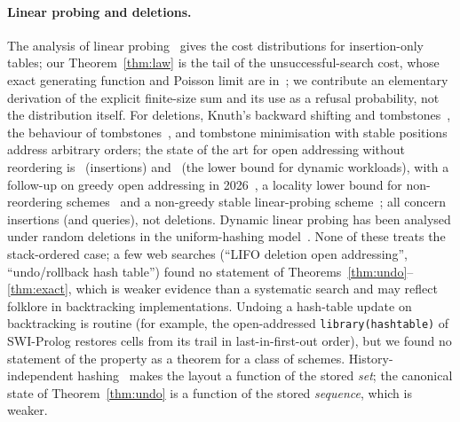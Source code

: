 \documentclass[11pt,a4paper]{article}
\theoremstyle{definition}
\theoremstyle{remark}
\newcommand{\code}[1]{\texttt{#1}}
\begin{document}
\paragraph{Linear probing and deletions.} The analysis of linear probing~\cite{knuth3,pittel1987,fpv1998,janson2001,janson2005,viola2005} gives the cost distributions for insertion-only tables; our Theorem~\ref{thm:law} is the tail of the unsuccessful-search cost, whose exact generating function and Poisson limit are in~\cite{janson2016}; we contribute an elementary derivation of the explicit finite-size sum and its use as a refusal probability, not the distribution itself. For deletions, Knuth's backward shifting and tombstones~\cite{knuth3,jimenez2018}, the behaviour of tombstones~\cite{bender2021}, and tombstone minimisation with stable positions~\cite{sanders2018} address arbitrary orders; the state of the art for open addressing without reordering is~\cite{fkk2024} (insertions) and~\cite{tinypointers2025} (the lower bound for dynamic workloads), with a follow-up on greedy open addressing in 2026~\cite{fkk2026}, a locality lower bound for non-reordering schemes~\cite{zamir2026} and a non-greedy stable linear-probing scheme~\cite{kkw2026}; all concern insertions (and queries), not deletions. Dynamic linear probing has been analysed under random deletions in the uniform-hashing model~\cite{larson1983}. None of these treats the stack-ordered case; a few web searches (``LIFO deletion open addressing'', ``undo/rollback hash table'') found no statement of Theorems~\ref{thm:undo}--\ref{thm:exact}, which is weaker evidence than a systematic search and may reflect folklore in backtracking implementations. Undoing a hash-table update on backtracking is routine (for example, the open-addressed \code{library(hashtable)} of SWI-Prolog restores cells from its trail in last-in-first-out order), but we found no statement of the property as a theorem for a class of schemes. History-independent hashing~\cite{naor2001,blelloch2007} makes the layout a function of the stored \emph{set}; the canonical state of Theorem~\ref{thm:undo} is a function of the stored \emph{sequence}, which is weaker.
\end{document}
